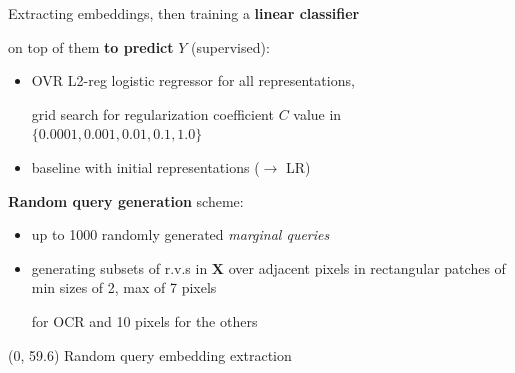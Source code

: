 \documentclass[final]{beamer}
\begin{document}
\begin{frame}{}
\begin{textblock}{25.2}
    Extracting embeddings, then training a \textbf{linear classifier}\par
    on top of them \textbf{to predict} $Y$ (supervised):
    \begin{itemize}
    \item OVR L2-reg logistic regressor for all representations,\par
      grid search for regularization coefficient $C$ value in $\{0.0001, 0.001, 0.01, 0.1, 1.0\}$
      \item  baseline with initial representations ($\rightarrow$ \textsf{LR})
    \end{itemize}\vspace{15pt}

    
    \textbf{Random query generation} scheme:
    \begin{itemize}
    \item up to 1000 randomly generated \emph{marginal queries}
    \item generating subsets of r.v.s in $\mathbf{X}$ over adjacent
        pixels in rectangular patches of min sizes of 2, max of 7 pixels\par
        for \textsf{OCR} and 10 pixels for the others
    \end{itemize}
  \end{textblock}

  
  \begin{textblock}{80}(0, 59.6)
    Random query embedding extraction
  \end{textblock}
  
  
    

\end{frame}
\end{document}
